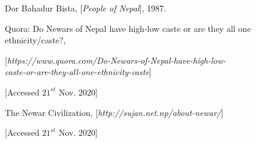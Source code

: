 \newpage
	\begin{thebibliography}{9}

		Dor Bahadur Bista,
			[\textit{People of Nepal}],
		1987.

		Quora: Do Newars of Nepal have high-low caste or are they all one ethnicity/caste?,
		
		[\textit{https://www.quora.com/Do-Newars-of-Nepal-have-high-low- \\ caste-or-are-they-all-one-ethnicity-caste}]
		
		[Accessed ${21}^{st}$ Nov. 2020]

		The Newar Civilization, 
		[\textit{http://sujan.net.np/about-newar/}]
		
		[Accessed ${21}^{st}$ Nov. 2020]

	\end{thebibliography}